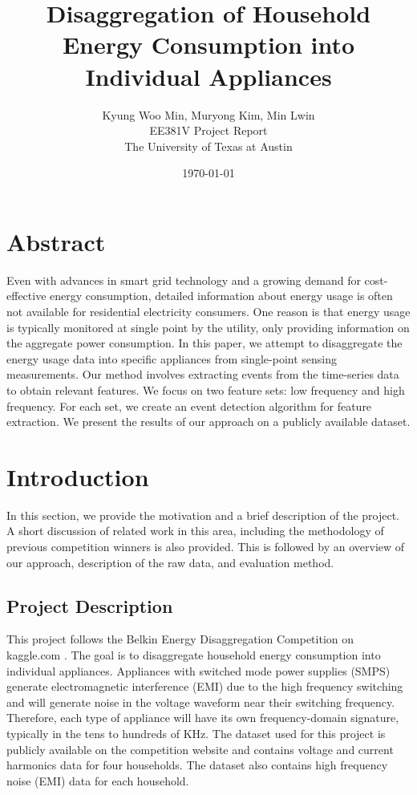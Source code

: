 \documentclass[11pt, letterpaper]{article}
\title{Disaggregation of Household Energy Consumption into Individual Appliances }
\date{\today}
\author{Kyung Woo Min, Muryong Kim, Min Lwin\\EE381V Project Report \\The University of Texas at Austin}
\begin{document}
\maketitle

\section{Abstract}
Even with advances in smart grid technology and a growing demand for cost-effective  energy consumption, detailed information about energy usage is often not available for residential electricity consumers. One reason is that energy usage is typically monitored at single point by the utility, only providing information on the aggregate power consumption.  In this paper, we attempt to disaggregate the energy usage data into specific appliances from single-point sensing measurements.  Our method involves extracting events from the time-series data to obtain relevant features.  We focus on two feature sets: low frequency and high frequency.  For each set, we create an event detection algorithm for feature extraction.  We present the results of our approach on a publicly available dataset.

\section{Introduction}

In this section, we provide the motivation and a brief description of the project.  A short discussion of related work in this area, including the methodology of previous competition winners is also provided.  This is followed by an overview of our approach, description of the raw data, and evaluation method.

\subsection{Project Description}

This project follows the Belkin Energy Disaggregation Competition on kaggle.com \cite{Kaggle}. The goal is to disaggregate household energy consumption into individual appliances. Appliances with switched mode power supplies (SMPS) generate electromagnetic interference (EMI) due to the high frequency switching and will generate noise in the voltage waveform near their switching frequency. Therefore, each type of appliance will have its own frequency-domain signature, typically in the tens to hundreds of KHz. The dataset used for this project is publicly available on the competition website and contains voltage and current harmonics data for four households.  The dataset also contains high frequency noise (EMI) data for each household.  
\end{document}

